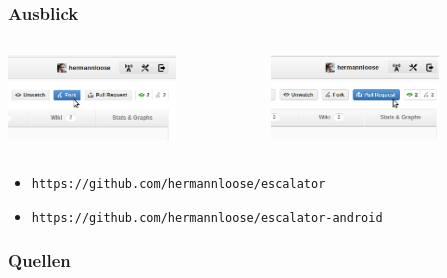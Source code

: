 \documentclass[10pt]{beamer}
\begin{document}
\begin{frame}[c]
  \frametitle{Ausblick}
  \begin{columns}
    \begin{column}{0.4\textwidth}
      \includegraphics[width=12em]{fork}
    \end{column}
    \begin{column}{0.4\textwidth}
      \includegraphics[width=12em]{pullrequest}
    \end{column}
  \end{columns}
  \begin{itemize}
    \item \texttt{https://github.com/hermannloose/escalator}
    \item \texttt{https://github.com/hermannloose/escalator-android}
  \end{itemize}
\end{frame}

\begin{frame}[c]
  \frametitle{Quellen}
  
  
\end{frame}
\end{document}
